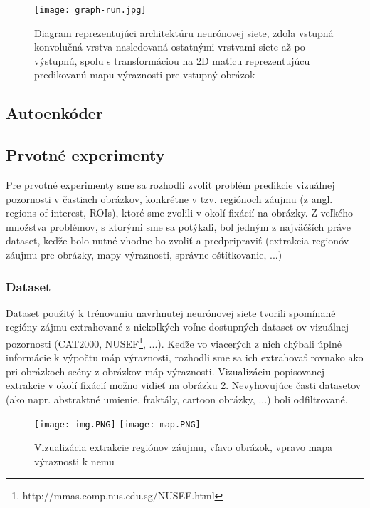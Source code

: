 \begin{figure}[H]
	\begin{center}\texttt{[image: graph-run.jpg]}
		\caption[Návrh architektúry neurónovej siete]{
			Diagram reprezentujúci architektúru neurónovej siete, zdola vstupná konvolučná vrstva nasledovaná ostatnými vrstvami siete až po výstupnú, spolu s transformáciou na 2D maticu reprezentujúcu predikovanú mapu výraznosti pre vstupný obrázok
		}\label{my_tensorboard_cnn}
	\end{center}
\end{figure}

\subsection{Autoenkóder}
\label{autoencoder_design}

\subsection{Prvotné experimenty}
\label{first_experiments}
Pre prvotné experimenty sme sa rozhodli zvoliť problém predikcie vizuálnej pozornosti v častiach obrázkov, konkrétne v tzv. regiónoch záujmu (z angl. regions of interest, ROIs), ktoré sme zvolili v okolí fixácií na obrázky. Z veľkého množstva problémov, s ktorými sme sa potýkali, bol jedným z najväčších práve dataset, keďže bolo nutné vhodne ho zvoliť a predpripraviť (extrakcia regionóv záujmu pre obrázky, mapy výraznosti, správne oštítkovanie, ...)

\subsubsection{Dataset}
\label{dataset}
Dataset použitý k trénovaniu navrhnutej neurónovej siete tvorili spomínané regióny zájmu extrahované z niekoľkých voľne dostupných dataset-ov vizuálnej pozornosti (CAT2000\cite{borji2015cat2000}, NUSEF\footnote{http://mmas.comp.nus.edu.sg/NUSEF.html}, ...). Keďže vo viacerých z nich chýbali úplné informácie k výpočtu máp výraznosti, rozhodli sme sa ich extrahovať rovnako ako pri obrázkoch scény z obrázkov máp výraznosti. Vizualizáciu popisovanej extrakcie v okolí fixácií možno vidieť na obrázku \ref{roi_image}. Nevyhovujúce časti datasetov (ako napr. abstraktné umienie, fraktály, cartoon obrázky, ...) boli odfiltrované.

\begin{figure}[H]
	\begin{center}
		\texttt{[image: img.PNG]}
		\texttt{[image: map.PNG]}
		\caption[Vizualizácia extrakcie regiónov záujmu]{
			Vizualizácia extrakcie regiónov záujmu, vľavo obrázok, vpravo mapa výraznosti k nemu
		}\label{roi_image}
	\end{center}
\end{figure}

